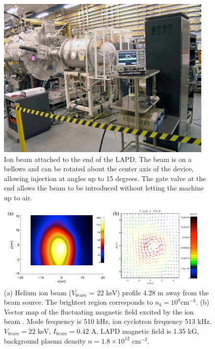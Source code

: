 \documentclass[11pt]{article}
\begin{document}
\begin{figure}[htbp] %
   \centering
   \includegraphics[width=0.95\textwidth]{ionbeamsource.jpg} 
   \caption{\small Ion beam attached to the end of the LAPD.  The beam is on a bellows and can be rotated about the center axis of the device, allowing injection at angles up to 15 degrees. The gate valve at the end allows the beam to be introduced without letting the machine up to air. }
   \label{fig:ionbeamsource}
\end{figure}
\begin{figure}[htbp] %
   \centering
   \includegraphics[width=0.95\textwidth]{ionbeam_and_wave.jpg} 
   \caption{\small (a) Helium ion beam ($V_{beam}$ = 22 keV) profile 4.28 m away from the beam source.  The brightest region corresponds to $n_{b} = 10^{8} $cm$^{-3}$. (b) Vector map of the fluctuating magnetic field excited by the ion beam .  Mode frequency is 510 kHz, ion cyclotron frequency 513 kHz.  $V_{beam} = 22$ keV, $I_{beam} = 0.42$ A, LAPD magnetic field is 1.35 kG, background plasma density $n = 1.8 \times 10^{12}$ cm$^{-3}$. }
   \label{fig:ionbeam_and_wave}
\end{figure}
 


%
%
%
%  
\end{document}
